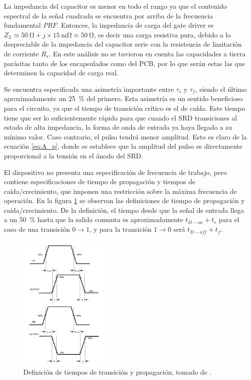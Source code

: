 La impedancia del capacitor es menor en todo el rango ya que el contenido
espectral de la señal cuadrada se encuentra por arriba de la frecuencia
fundamental $PRF$. Entonces, la impedancia de carga del gate driver es $Z_L
\approx \qty{50}{\ohm} + j \times \qty{15}{\milli\ohm} \approx \qty{50}{\ohm}$,
es decir una carga resistiva pura, debido a lo despreciable de la impedancia del
capacitor serie con la resistencia de limitación de corriente $R_s$. En este
análisis no se tuvieron en cuenta las capacidades a tierra parásitas tanto de
los encapsulados como del PCB, por lo que serán estas las que determinen la
capacidad de carga real.

Se encuentra especificada una asimetría importante entre $\tau_r$ y $\tau_f$,
siendo el último aproximadamente un \qty{25}{\percent} del primero. Esta
asimetría es un sentido beneficioso para el circuito, ya que el tiempo de
transición crítico es el de caída. Este tiempo tiene que ser lo suficientemente
rápido para que cuando el SRD transiciones al estado de alta impedancia, la forma
de onda de entrada ya haya llegado a su mínimo valor. Caso contrario, el pulso
tendrá menor amplitud. Esto es claro de la ecuación \ref{eq:A_p}, donde se
establece que la amplitud del pulso es directamente proporcional a la tensión en
el ánodo del SRD.

El dispositivo no presenta una especificación de frecuencia de trabajo, pero
contiene especificaciones de tiempo de propagación y tiempos de
caída/crecimiento, que imponen una restricción sobre la máxima frecuencia de
operación. En la figura \ref{fig:lm5114_timing_definitions} se observan las
definiciones de tiempo de propagación y caída/crecimiento. De la definición, el
tiempo desde que la señal de entrada llega a un \qty{50}{\percent} hasta que la
salida conmuta es aproximadamente $t_{D-on}+t_{r}$ para el caso de una
transición $0\to1$, y para la transición $1\to0$ será $t_{D-off}+t_{f}$.

\begin{figure}[tbp]
    \centering
    \includegraphics[width=0.4\textwidth]{images/lm5114_timing_definitions.png}
    \caption{Definición de tiempos de transición y propagación, tomado de
    \cite{LM5114_datasheet}.}
    \label{fig:lm5114_timing_definitions}
\end{figure}


